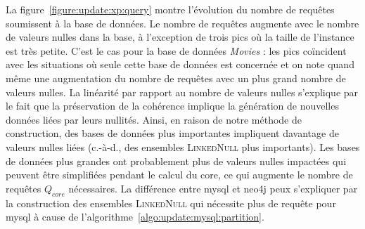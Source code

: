 La figure~\ref{figure:update:xp:query} montre l'évolution du nombre de requêtes soumissent à la base de données.
Le nombre de requêtes augmente avec le nombre de valeurs nulles dans la base, à l'exception de trois pics où la taille de l'instance est très petite.
C'est le cas pour la base de données \textit{Movies} : les pics coïncident avec les situations où seule cette base de données est concernée et on note quand même une augmentation du nombre de requêtes avec un plus grand nombre de valeurs nulles.
La linéarité par rapport au nombre de valeurs nulles s'explique par le fait que la préservation de la cohérence implique la génération de nouvelles données liées par leurs nullités.
Ainsi, en raison de notre méthode de construction, des bases de données plus importantes impliquent davantage de valeurs nulles liées (c.-à-d., des ensembles \textsc{LinkedNull} plus importants).
Les bases de données plus grandes ont probablement plus de valeurs nulles impactées qui peuvent être simplifiées pendant le calcul du core, ce qui augmente le nombre de requêtes $Q_{core}$ nécessaires.
La différence entre \gls{mysql} et \gls{neo4j} peux s'expliquer par la construction des ensembles \textsc{LinkedNull} qui nécessite plus de requête pour \gls{mysql} à cause de l'algorithme~\ref{algo:update:mysql:partition}.

